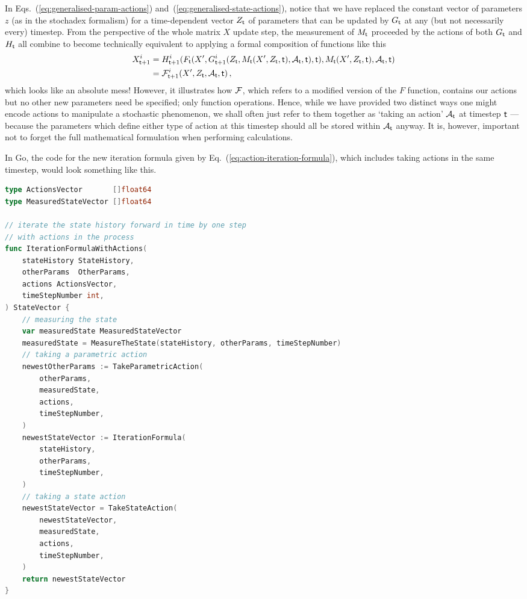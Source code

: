 In Eqs.~(\ref{eq:generalised-param-actions}) and~(\ref{eq:generalised-state-actions}), notice that we have replaced the constant vector of parameters $z$ (as in the stochadex formalism) for a time-dependent vector $Z_{{\sf t}}$ of parameters that can be updated by $G_{\sf t}$ at any (but not necessarily every) timestep. From the perspective of the whole matrix $X$ update step, the measurement of $M_{\sf t}$ proceeded by the actions of both $G_{\sf t}$ and $H_{\sf t}$ all combine to become technically equivalent to applying a formal composition of functions like this
\begin{align}
X^i_{{\sf t}+1} &=H^i_{{\sf t}+1}( F_{\sf t}(X', G_{{\sf t}+1}^i(Z_{{\sf t}}, M_{{\sf t}}(X', Z_{{\sf t}}, {\sf t}), {\cal A}_{{\sf t}}, {\sf t}), {\sf t}), M_{{\sf t}}(X', Z_{{\sf t}}, {\sf t}), {\cal A}_{{\sf t}}, {\sf t} ) \\
&= {\cal F}^i_{{\sf t}+1}(X', Z_{{\sf t}}, {\cal A}_{\sf t}, {\sf t}) \label{eq:action-iteration-formula}\,,
\end{align}
which looks like an absolute mess! However, it illustrates how ${\cal F}$, which refers to a modified version of the $F$ function, contains our actions but no other new parameters need be specified; only function operations. Hence, while we have provided two distinct ways one might encode actions to manipulate a stochastic phenomenon, we shall often just refer to them together as `taking an action' ${\cal A}_{\sf t}$ at timestep ${\sf t}$ --- because the parameters which define either type of action at this timestep should all be stored within ${\cal A}_{\sf t}$ anyway. It is, however, important not to forget the full mathematical formulation when performing calculations. 

In Go, the code for the new iteration formula given by Eq.~(\ref{eq:action-iteration-formula}), which includes taking actions in the same timestep, would look something like this.

\begin{lstlisting}[language=Go]
type ActionsVector       []float64
type MeasuredStateVector []float64

// iterate the state history forward in time by one step
// with actions in the process
func IterationFormulaWithActions(
    stateHistory StateHistory, 
    otherParams  OtherParams,
    actions ActionsVector,
    timeStepNumber int,
) StateVector {
    // measuring the state
    var measuredState MeasuredStateVector
    measuredState = MeasureTheState(stateHistory, otherParams, timeStepNumber)
    // taking a parametric action
    newestOtherParams := TakeParametricAction(
        otherParams,
        measuredState, 
        actions,
        timeStepNumber,
    )
    newestStateVector := IterationFormula(
        stateHistory, 
        otherParams,
        timeStepNumber,
    )
    // taking a state action
    newestStateVector = TakeStateAction(
        newestStateVector,
        measuredState,
        actions,
        timeStepNumber,
    )
    return newestStateVector
}
\end{lstlisting}

